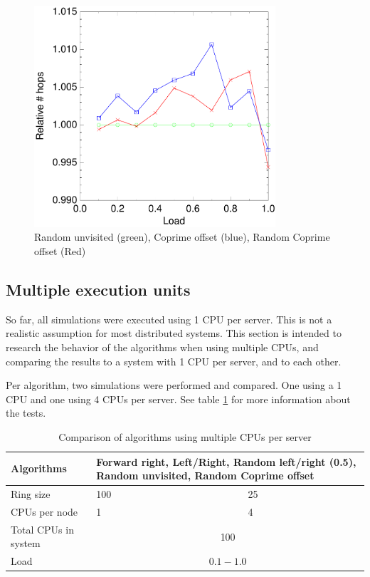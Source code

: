 \documentclass[10pt,a4paper]{article}
\begin{document}
\begin{figure}[h!tb]
\centering
\includegraphics[width=0.8\textwidth]{data/randunvisited_prime_randprime.pdf}
\caption{Random unvisited (green), Coprime offset (blue), Random Coprime offset (Red)}
\label{figrandunvisited}
\end{figure}



\subsection{Multiple execution units}
So far, all simulations were executed using 1 CPU per server. This is not a realistic assumption for most distributed systems. This section is intended to research the behavior of the algorithms when using multiple CPUs, and comparing the results to a system with 1 CPU per server, and to each other.

Per algorithm, two simulations were performed and compared. One using a 1 CPU and one using 4 CPUs per server. See table \ref{tabcpus} for more information about the tests.

\begin{table}[h!]
\centering
\begin{tabular}{|p{}|p{}|p{}|} \hline
Algorithms & \multicolumn{2}{|p{0.7\textwidth}|}{Forward right, Left/Right, Random left/right (0.5), Random unvisited, Random Coprime offset} \\ \hline
Ring size & 100 & 25 \\ \hline
CPUs per node	& 1 & 4 \\ \hline
Total CPUs in system & \multicolumn{2}{|c|}{100} \\ \hline
Load	& \multicolumn{2}{|c|}{$0.1 - 1.0$} \\ \hline
\end{tabular}
\caption{Comparison of algorithms using multiple CPUs per server}
\label{tabcpus}
\end{table}
\end{document}
